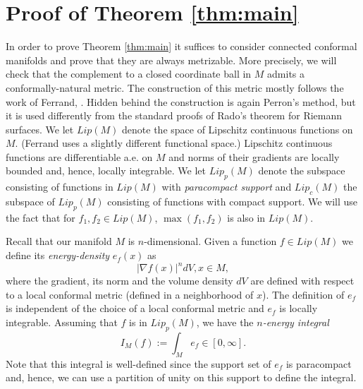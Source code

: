 \documentclass[11pt]{article}   	%
\begin{document}
\section{Proof of Theorem \ref{thm:main}}


 In order to prove Theorem \ref{thm:main} it suffices to consider connected conformal manifolds and prove that they are always metrizable. 
 More precisely, we will check that the complement to a closed coordinate ball in $M$ admits a conformally-natural metric. 
The construction of this metric mostly follows the work of Ferrand, \cite{Ferrand}. Hidden behind the construction is again Perron's method, but it is used differently 
from the standard proofs of Rado's theorem for Riemann surfaces. We let $Lip(M)$ denote the space of Lipschitz 
continuous functions on $M$. (Ferrand uses a slightly different functional space.) 
Lipschitz continuous functions are differentiable a.e. on $M$ and norms of their gradients are locally bounded and, hence, locally integrable.  
We let $Lip_p(M)$ denote the subspace consisting of functions in $Lip(M)$ with {\em paracompact support} and $Lip_c(M)$ the 
subspace of $Lip_p(M)$ consisting of functions with compact support. We will use the fact that for $f_1, f_2\in Lip(M)$, $\max(f_1,f_2)$ is also in $Lip(M)$. 

Recall that our manifold $M$ is $n$-dimensional. 
Given a function $f\in Lip(M)$ we define its {\em energy-density} $e_f(x)$ as   
$$
|\nabla f(x)|^n dV, x\in M,
$$
where the gradient, its norm and the volume density $dV$ are defined with respect to a local conformal metric (defined in a neighborhood of $x$).  
The definition of $e_f$ is independent of the choice of a local conformal metric and $e_f$ is locally integrable. 
Assuming that $f$ is in $Lip_p(M)$, we have the {\em $n$-energy integral} 
$$
I_M(f):= \int_M e_f\in [0,\infty]. 
$$
Note that this integral is well-defined since the support set of $e_f$ is paracompact and, hence, we can use a partition of unity on this support to define the integral. 
\end{document}
